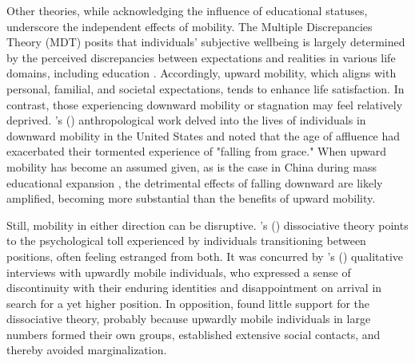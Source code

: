 Other theories, while acknowledging the influence of educational statuses, underscore the independent effects of mobility. The Multiple Discrepancies Theory (MDT) posits that individuals' subjective wellbeing is largely determined by the perceived discrepancies between expectations and realities in various life domains, including education \parencite{michalosMultipleDiscrepanciesTheory1985}. Accordingly, upward mobility, which aligns with personal, familial, and societal expectations, tends to enhance life satisfaction. In contrast, those experiencing downward mobility or stagnation may feel relatively deprived. \citeauthor{newmanFallingGraceDownward1999}'s (\citeyear{newmanFallingGraceDownward1999}) anthropological work delved into the lives of individuals in downward mobility in the United States and noted that the age of affluence had exacerbated their tormented experience of "falling from grace." When upward mobility has become an assumed given, as is the case in China during mass educational expansion \parencite{xieTrendsSocialMobility2022,yeungHigherEducationExpansion2013}, the detrimental effects of falling downward are likely amplified, becoming more substantial than the benefits of upward mobility.

Still, mobility in either direction can be disruptive. \citeauthor{sorokin1927social}'s (\citeyear{sorokin1927social}) dissociative theory points to the psychological toll experienced by individuals transitioning between positions, often feeling estranged from both. It was concurred by \citeauthor{straussContextsSocialMobility1971}'s (\citeyear{straussContextsSocialMobility1971}) qualitative interviews with upwardly mobile individuals, who expressed a sense of discontinuity with their enduring identities and disappointment on arrival in search for a yet higher position. In opposition, \textcite{goldthorpeSocialMobilityClass1980} found little support for the dissociative theory, probably because upwardly mobile individuals in large numbers formed their own groups, established extensive social contacts, and thereby avoided marginalization.

